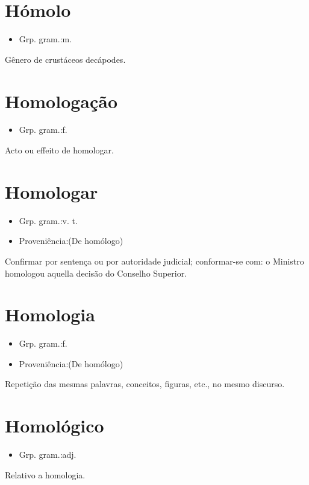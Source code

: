\documentclass{article}
\begin{document}
\section{Hómolo}
\begin{itemize}
\item {Grp. gram.:m.}
\end{itemize}
Gênero de crustáceos decápodes.
\section{Homologação}
\begin{itemize}
\item {Grp. gram.:f.}
\end{itemize}
Acto ou effeito de homologar.
\section{Homologar}
\begin{itemize}
\item {Grp. gram.:v. t.}
\end{itemize}
\begin{itemize}
\item {Proveniência:(De \textunderscore homólogo\textunderscore )}
\end{itemize}
Confirmar por sentença ou por autoridade judicial; conformar-se com: \textunderscore o Ministro homologou aquella decisão do Conselho Superior\textunderscore .
\section{Homologia}
\begin{itemize}
\item {Grp. gram.:f.}
\end{itemize}
\begin{itemize}
\item {Proveniência:(De \textunderscore homólogo\textunderscore )}
\end{itemize}
Repetição das mesmas palavras, conceitos, figuras, etc., no mesmo discurso.
\section{Homológico}
\begin{itemize}
\item {Grp. gram.:adj.}
\end{itemize}
Relativo a homologia.
\end{document}
